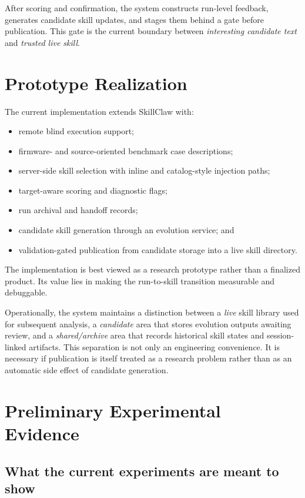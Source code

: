 \documentclass[11pt]{article}
\begin{document}
After scoring and confirmation, the system constructs run-level feedback, generates
candidate skill updates, and stages them behind a gate before publication.  This gate is
the current boundary between \emph{interesting candidate text} and \emph{trusted live
skill}.

\section{Prototype Realization}
\label{sec:prototype}

The current implementation extends SkillClaw with:
\begin{itemize}[leftmargin=*]
    \item remote blind execution support;
    \item firmware- and source-oriented benchmark case descriptions;
    \item server-side skill selection with inline and catalog-style injection paths;
    \item target-aware scoring and diagnostic flags;
    \item run archival and handoff records;
    \item candidate skill generation through an evolution service; and
    \item validation-gated publication from candidate storage into a live skill
    directory.
\end{itemize}

The implementation is best viewed as a research prototype rather than a finalized product.
Its value lies in making the run-to-skill transition measurable and debuggable.

Operationally, the system maintains a distinction between a \emph{live} skill library
used for subsequent analysis, a \emph{candidate} area that stores evolution outputs
awaiting review, and a \emph{shared/archive} area that records historical skill states
and session-linked artifacts.  This separation is not only an engineering convenience.
It is necessary if publication is itself treated as a research problem rather than as an
automatic side effect of candidate generation.

\section{Preliminary Experimental Evidence}
\label{sec:evidence}

\subsection{What the current experiments are meant to show}
\end{document}
